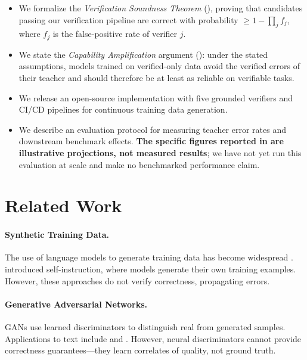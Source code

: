 \documentclass[11pt,a4paper]{article}
\begin{document}
\begin{itemize}
    \item We formalize the \emph{Verification Soundness Theorem} (), proving that candidates passing our verification pipeline are correct with probability $\geq 1 - \prod_{j} f_j$, where $f_j$ is the false-positive rate of verifier $j$.

    \item We state the \emph{Capability Amplification} argument (): under the stated assumptions, models trained on verified-only data avoid the verified errors of their teacher and should therefore be at least as reliable on verifiable tasks.

    \item We release an open-source implementation with five grounded verifiers and CI/CD pipelines for continuous training data generation.

    \item We describe an evaluation protocol for measuring teacher error rates and downstream benchmark effects. \textbf{The specific figures reported in  are illustrative projections, not measured results}; we have not yet run this evaluation at scale and make no benchmarked performance claim.
\end{itemize}

\section{Related Work}
\label{sec:related}

\paragraph{Synthetic Training Data.}
The use of language models to generate training data has become widespread \citep{alpaca,vicuna,selfinstruct}. \citet{selfinstruct} introduced self-instruction, where models generate their own training examples. However, these approaches do not verify correctness, propagating errors.

\paragraph{Generative Adversarial Networks.}
GANs \citep{goodfellow2014gan} use learned discriminators to distinguish real from generated samples. Applications to text include \citet{seqgan} and \citet{textgan}. However, neural discriminators cannot provide correctness guarantees---they learn correlates of quality, not ground truth.
\end{document}
